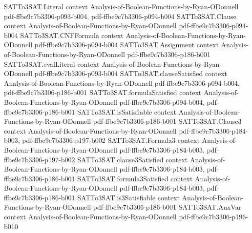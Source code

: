 \begin{theorem}
\label{SATTo3SAT.SAT_to_3SAT_completeness}
\leanok
{}
\proofstep
  {SATTo3SAT.Literal}
  {context}
  {Analysis-of-Boolean-Functions-by-Ryan-ODonnell}
  {pdf-ffbe9c7b3306-p093-b004,
    pdf-ffbe9c7b3306-p094-b004}
\proofstep
  {SATTo3SAT.Clause}
  {context}
  {Analysis-of-Boolean-Functions-by-Ryan-ODonnell}
  {pdf-ffbe9c7b3306-p094-b004}
\proofstep
  {SATTo3SAT.CNFFormula}
  {context}
  {Analysis-of-Boolean-Functions-by-Ryan-ODonnell}
  {pdf-ffbe9c7b3306-p094-b004}
\proofstep
  {SATTo3SAT.Assignment}
  {context}
  {Analysis-of-Boolean-Functions-by-Ryan-ODonnell}
  {pdf-ffbe9c7b3306-p186-b001}
\proofstep
  {SATTo3SAT.evalLiteral}
  {context}
  {Analysis-of-Boolean-Functions-by-Ryan-ODonnell}
  {pdf-ffbe9c7b3306-p093-b004}
\proofstep
  {SATTo3SAT.clauseSatisfied}
  {context}
  {Analysis-of-Boolean-Functions-by-Ryan-ODonnell}
  {pdf-ffbe9c7b3306-p094-b004,
    pdf-ffbe9c7b3306-p186-b001}
\proofstep
  {SATTo3SAT.formulaSatisfied}
  {context}
  {Analysis-of-Boolean-Functions-by-Ryan-ODonnell}
  {pdf-ffbe9c7b3306-p094-b004,
    pdf-ffbe9c7b3306-p186-b001}
\proofstep
  {SATTo3SAT.isSatisfiable}
  {context}
  {Analysis-of-Boolean-Functions-by-Ryan-ODonnell}
  {pdf-ffbe9c7b3306-p186-b001}
\proofstep
  {SATTo3SAT.Clause3}
  {context}
  {Analysis-of-Boolean-Functions-by-Ryan-ODonnell}
  {pdf-ffbe9c7b3306-p184-b003,
    pdf-ffbe9c7b3306-p197-b002}
\proofstep
  {SATTo3SAT.Formula3}
  {context}
  {Analysis-of-Boolean-Functions-by-Ryan-ODonnell}
  {pdf-ffbe9c7b3306-p184-b003,
    pdf-ffbe9c7b3306-p197-b002}
\proofstep
  {SATTo3SAT.clause3Satisfied}
  {context}
  {Analysis-of-Boolean-Functions-by-Ryan-ODonnell}
  {pdf-ffbe9c7b3306-p184-b003,
    pdf-ffbe9c7b3306-p186-b001}
\proofstep
  {SATTo3SAT.formula3Satisfied}
  {context}
  {Analysis-of-Boolean-Functions-by-Ryan-ODonnell}
  {pdf-ffbe9c7b3306-p184-b003,
    pdf-ffbe9c7b3306-p186-b001}
\proofstep
  {SATTo3SAT.is3Satisfiable}
  {context}
  {Analysis-of-Boolean-Functions-by-Ryan-ODonnell}
  {pdf-ffbe9c7b3306-p186-b001}
\proofstep
  {SATTo3SAT.AuxVar}
  {context}
  {Analysis-of-Boolean-Functions-by-Ryan-ODonnell}
  {pdf-ffbe9c7b3306-p196-b010}

\end{theorem}
